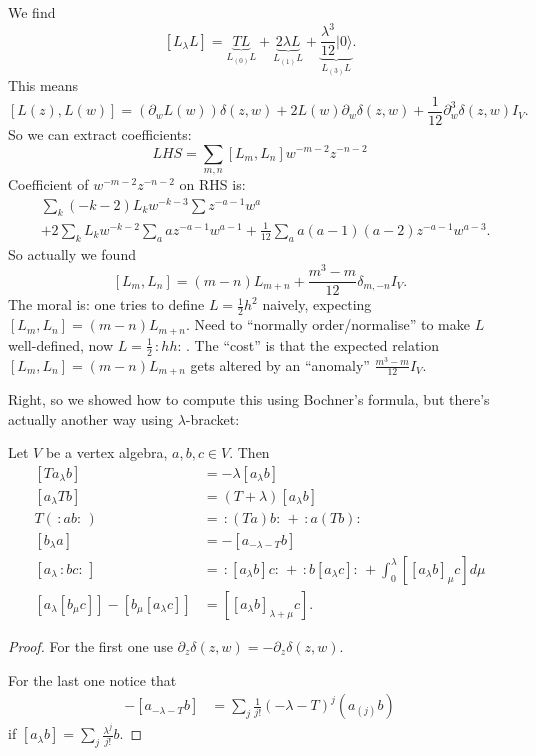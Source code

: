 \begin{example}
We find
$$
[L_\lambda L]=\underbrace{TL}_{L_{(0)}L}
+\underbrace{2\lambda L}_{L_{(1)}L}
+\underbrace{\frac{\lambda^3}{12}|0\rangle}_{L_{(3)}L}.
$$
This means
\begin{equation}
\label{equation-looks-important}
[L(z),L(w)]=(\partial_wL(w))\delta(z,w)
+2L(w)\partial_w\delta(z,w)
+\frac{1}{12}\partial_w^3\delta(z,w)I_V.
\end{equation}
So we can extract coefficients:
$$
LHS=\sum_{m,n}[L_m,L_n]w^{-m-2}z^{-n-2}
$$
Coefficient of $w^{-m-2}z^{-n-2}$ on RHS is:
\begin{align*}
&\sum_{k}(-k-2)L_kw^{-k-3}\sum z^{-a-1}w^a\\
&+2\sum_{k}L_kw^{-k-2}\sum_{a}az^{-a-1}w^{a-1}
+\frac{1}{12}\sum_{a}a(a-1)(a-2)z^{-a-1}w^{a-3}.
\end{align*}
So actually we found
$$
[L_m,L_n]=(m-n)L_{m+n}+\frac{m^3-m}{12}\delta_{m,-n}I_V.
$$
The moral is: one tries to define $L=\frac{1}{2}h^2$ naively,
expecting $[L_m,L_n]=(m-n)L_{m+n}$.
Need to ``normally order/normalise'' to make $L$ 
well-defined, now $L=\frac{1}{2}\,:\!h h\!:\,$.
The ``cost'' is that the expected relation
$[L_m,L_n]=(m-n)L_{m+n}$ gets altered by an 
``anomaly'' $\frac{m^3-m}{12}I_V$.
\end{example}

Right, so we showed how to compute this using Bochner's
formula, but there's actually another way
using $\lambda$-bracket:

\begin{theorem}
\label{theorem-lambda-brackets}
Let $V$ be a vertex algebra, $a,b,c \in V$.
Then
\begin{align}
\label{equation-lambda-brackets}
[Ta_\lambda b]&=-\lambda[a_\lambda b]\\
[a_\lambda Tb]&=(T+\lambda)[a_\lambda b]\\
T(\,:\!ab\!:\,)&=\,:\!(Ta)b\!:\,+\,:\!a(Tb)\!:\,\\
[b_\lambda a]&=-[a_{-\lambda -T}b]\\
[a_\lambda \,:\!bc\!:\,]&=\,:\![a_\lambda b]c\!:\,+\,:\!b[a_\lambda c]\!:\,
+\int_0^\lambda [[a_\lambda b]_\mu c]d\mu\\
[a_\lambda[b_\mu c]]-[b_\mu [a_\lambda c]]&=[[a_\lambda b]_{\lambda+\mu}c].
\end{align}
\end{theorem}

\begin{proof}
For the first one use $\partial_z \delta(z,w)=-\partial_z \delta(z,w)$.

For the last one notice that
\begin{align*}
-[a_{-\lambda - T}b]&=\sum_{j}\frac{1}{j!}(-\lambda-T)^j(a_{(j)}b)
\end{align*}
if $[a_\lambda b] =\sum_{j}\frac{\lambda^j}{j!}b$.
\end{proof}

